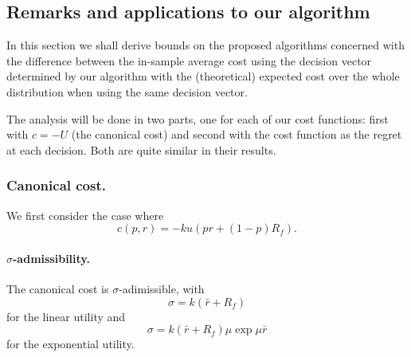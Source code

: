 \subsection{Remarks and applications to our algorithm}

In this section we shall derive bounds on the proposed algorithms concerned with the
difference between the in-sample average cost using the decision vector determined by our
algorithm with the (theoretical) expected cost over the whole distribution when using the
same decision vector. 

The analysis will be done in two parts, one for each of our cost functions: first with
$c=-U$ (the canonical cost) and second with the cost function as the regret at each
decision. Both are quite similar in their results. 

\subsubsection{Canonical cost.}
We first consider the case where 
\begin{equation*}
  c(p,r) = -k u(pr + (1-p)R_f).
\end{equation*}

\paragraph{$\sigma$-admissibility.}  The canonical cost is $\sigma$-adimissible, with 
\begin{equation}
  \label{linearSigmaAdmissibility}
  \sigma = k(\bar r+R_f)
\end{equation}
for the linear utility and 
\begin{equation}
  \label{expSigmaAdmissibility}
  \sigma = k (\bar r+ R_f) \mu\exp\mu\bar r
\end{equation}
for the exponential utility.

